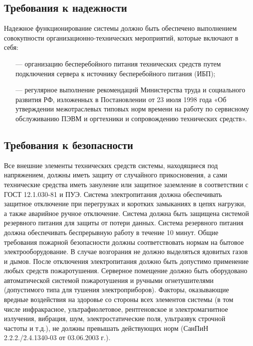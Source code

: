 \subsection{Требования к надежности}

Надежное функционирование системы должно быть обеспечено выполнением совокупности организационно-технических мероприятий, которые включают в себя:

\begin{itemize}
\item[---]организацию бесперебойного питания технических средств путем подключения сервера к источнику бесперебойного питания (ИБП);
\item[---]регулярное выполнение рекомендаций Министерства труда и социального развития РФ, изложенных в Постановлении от 23 июля 1998 года «Об утверждении межотраслевых типовых норм времени на работу по сервисному обслуживанию ПЭВМ и оргтехники и сопровождению технических средств».
\end{itemize}

\subsection{Требования к безопасности}

Все внешние элементы технических средств системы, находящиеся под напряжением, должны иметь защиту от случайного прикосновения, а сами технические средства иметь зануление или защитное заземление в соответствии с ГОСТ 12.1.030-81 и ПУЭ. Система электропитания должна обеспечивать защитное отключение при перегрузках и коротких замыканиях в цепях нагрузки, а также аварийное ручное отключение. Система должна быть защищена системой резервного питания для защиты от потери данных. Система резервного питания должна обеспечивать беспрерывную работу в течение 10 минут. Общие требования пожарной безопасности должны соответствовать нормам на бытовое электрооборудование. В случае возгорания не должно выделяться ядовитых газов и дымов. После отключения электропитания должно быть допустимо применение любых средств пожаротушения. Серверное помещение должно быть оборудовано автоматической системой пожаротушения и ручными огнетушителями (допустимого типа для тушения электроприборов). Факторы, оказывающие вредные воздействия на здоровье со стороны всех элементов системы (в том числе инфракрасное, ультрафиолетовое, рентгеновское и электромагнитное излучения, вибрация, шум, электростатические поля, ультразвук строчной частоты и т.д.), не должны превышать действующих норм (СанПиН 2.2.2./2.4.1340-03 от 03.06.2003 г.).

